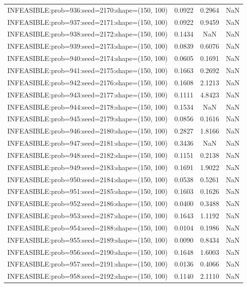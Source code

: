 \begin{longtable}{lccc}
INFEASIBLE:prob=936:seed=2170:shape=(150, 100) & 0.0922 &  0.2964 &    NaN \\
INFEASIBLE:prob=937:seed=2171:shape=(150, 100) & 0.0922 &  0.9459 &    NaN \\
INFEASIBLE:prob=938:seed=2172:shape=(150, 100) & 0.1434 &     NaN &    NaN \\
INFEASIBLE:prob=939:seed=2173:shape=(150, 100) & 0.0839 &  0.6076 &    NaN \\
INFEASIBLE:prob=940:seed=2174:shape=(150, 100) & 0.0605 &  0.1691 &    NaN \\
INFEASIBLE:prob=941:seed=2175:shape=(150, 100) & 0.1663 &  0.2692 &    NaN \\
INFEASIBLE:prob=942:seed=2176:shape=(150, 100) & 0.1608 &  2.1213 &    NaN \\
INFEASIBLE:prob=943:seed=2177:shape=(150, 100) & 0.1111 &  4.8423 &    NaN \\
INFEASIBLE:prob=944:seed=2178:shape=(150, 100) & 0.1534 &     NaN &    NaN \\
INFEASIBLE:prob=945:seed=2179:shape=(150, 100) & 0.0856 &  0.1616 &    NaN \\
INFEASIBLE:prob=946:seed=2180:shape=(150, 100) & 0.2827 &  1.8166 &    NaN \\
INFEASIBLE:prob=947:seed=2181:shape=(150, 100) & 0.3436 &     NaN &    NaN \\
INFEASIBLE:prob=948:seed=2182:shape=(150, 100) & 0.1151 &  0.2138 &    NaN \\
INFEASIBLE:prob=949:seed=2183:shape=(150, 100) & 0.1691 &  1.9022 &    NaN \\
INFEASIBLE:prob=950:seed=2184:shape=(150, 100) & 0.0538 &  0.5261 &    NaN \\
INFEASIBLE:prob=951:seed=2185:shape=(150, 100) & 0.1603 &  0.1626 &    NaN \\
INFEASIBLE:prob=952:seed=2186:shape=(150, 100) & 0.0400 &  0.3488 &    NaN \\
INFEASIBLE:prob=953:seed=2187:shape=(150, 100) & 0.1643 &  1.1192 &    NaN \\
INFEASIBLE:prob=954:seed=2188:shape=(150, 100) & 0.0104 &  0.1986 &    NaN \\
INFEASIBLE:prob=955:seed=2189:shape=(150, 100) & 0.0090 &  0.8434 &    NaN \\
INFEASIBLE:prob=956:seed=2190:shape=(150, 100) & 0.1648 &  1.6003 &    NaN \\
INFEASIBLE:prob=957:seed=2191:shape=(150, 100) & 0.0136 &  0.4066 &    NaN \\
INFEASIBLE:prob=958:seed=2192:shape=(150, 100) & 0.1140 &  2.1110 &    NaN \\

\end{longtable}
